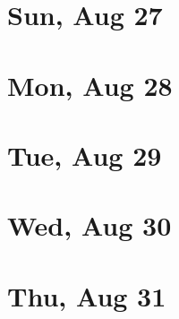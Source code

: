 	\section{Sun, Aug 27}
		
		
	\section{Mon, Aug 28}
		
		
	\section{Tue, Aug 29}
		
		
	\section{Wed, Aug 30}
		
		
	\section{Thu, Aug 31}
		
		
